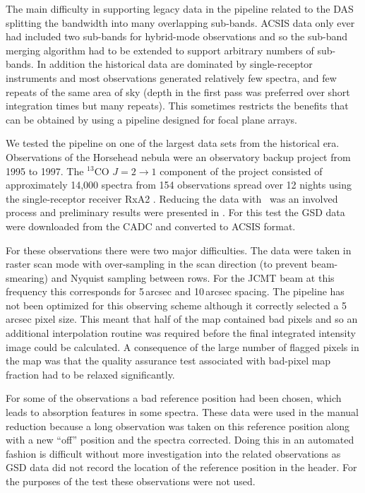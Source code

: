 \documentclass[final,authoryear,5p,times,twocolumn]{elsarticle}
\begin{document}
The main difficulty in supporting legacy data in the pipeline related
to the DAS splitting the bandwidth into many overlapping
sub-bands. ACSIS data only ever had included two sub-bands for hybrid-mode
observations and so the sub-band merging algorithm had to be
extended to support arbitrary numbers of sub-bands.  In addition the
historical data are dominated by single-receptor instruments and most
observations generated relatively few spectra, and few repeats of the
same area of sky (depth in the first pass was preferred over short
integration times but many repeats). This sometimes
restricts the benefits that can be obtained by using a pipeline
designed for focal plane arrays.

We tested the pipeline on one of the largest data sets from the
historical era. Observations of the Horsehead nebula were an
observatory backup project from 1995 to 1997. The $^{13}$CO
$J=2\rightarrow 1$ component of the project consisted of approximately
14,000 spectra from 154 observations spread over 12 nights using the
single-receptor receiver RxA2 \citep{1992IJIMW..13..647D}. Reducing
the data with \specx\ was an involved process and preliminary results
were presented in \citet{2001AAS...19915601S}. For this test the GSD data were
downloaded from the CADC and converted to ACSIS format.

For these observations there were two major difficulties. The data
were taken in raster scan mode with over-sampling in the scan
direction (to prevent beam-smearing) and Nyquist sampling between
rows. For the JCMT beam at this frequency this corresponds for
5\,arcsec and 10\,arcsec spacing. The pipeline has not been optimized
for this observing scheme although it correctly selected a 5\,arcsec
pixel size. This meant that half of the map contained bad pixels and
so an additional interpolation routine was required before the final
integrated intensity image could be calculated. A consequence of the
large number of flagged pixels in the map was that the quality
assurance test associated with bad-pixel map fraction had to be
relaxed significantly.

For some of the observations a bad reference position had been chosen,
which leads to absorption features in some spectra. These data were
used in the manual reduction because a long observation was taken on
this reference position along with a new ``off'' position and the
spectra corrected. Doing this in an automated fashion is difficult
without more investigation into the related observations as GSD data
did not record the location of the reference position in the
header. For the purposes of the test these observations were not used.
\end{document}
